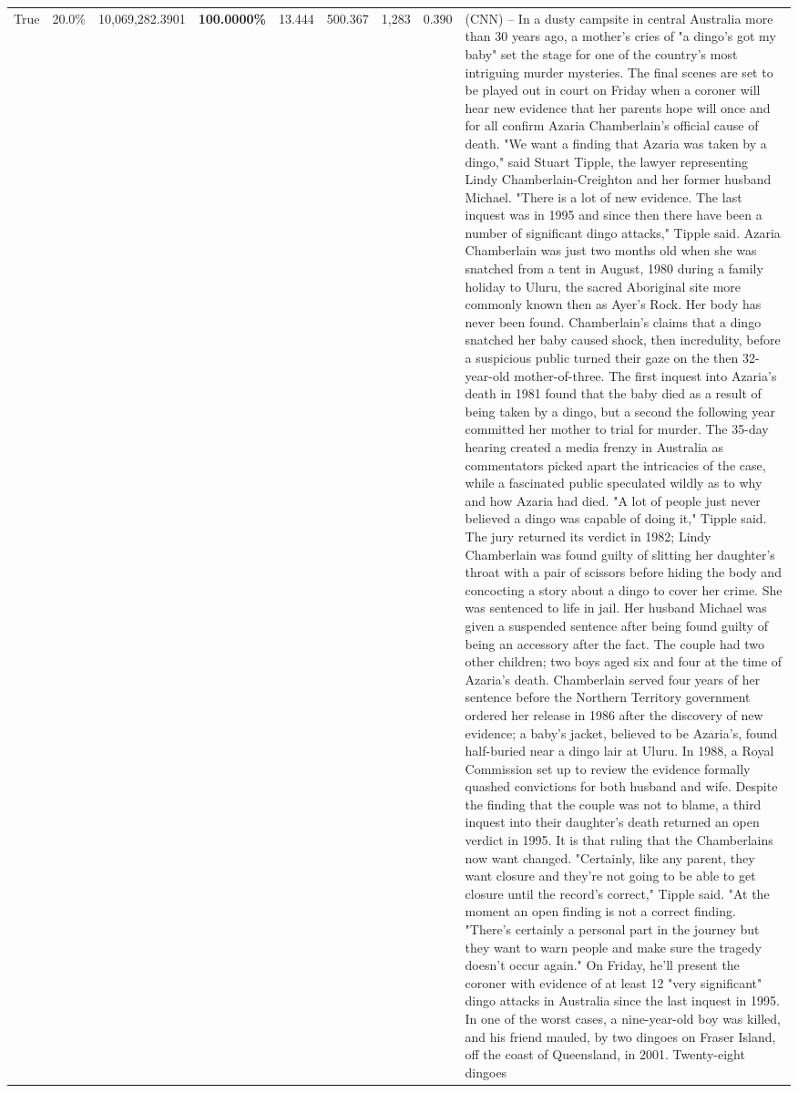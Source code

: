 \begin{table}[H]
\begin{tabular}{lllrlllll}
True & 20.0\% & 10,069,282.3901 & \bfseries \color{red} 100.0000\% & 13.444 & 500.367 & 1,283 & 0.390 & (CNN) -- In a dusty campsite in central Australia more than 30 years ago, a mother's cries of "a dingo's got my baby" set the stage for one of the country's most intriguing murder mysteries. The final scenes are set to be played out in court on Friday when a coroner will hear new evidence that her parents hope will once and for all confirm Azaria Chamberlain's official cause of death. "We want a finding that Azaria was taken by a dingo," said Stuart Tipple, the lawyer representing Lindy Chamberlain-Creighton and her former husband Michael. "There is a lot of new evidence. The last inquest was in 1995 and since then there have been a number of significant dingo attacks," Tipple said. Azaria Chamberlain was just two months old when she was snatched from a tent in August, 1980 during a family holiday to Uluru, the sacred Aboriginal site more commonly known then as Ayer's Rock. Her body has never been found. Chamberlain's claims that a dingo snatched her baby caused shock, then incredulity, before a suspicious public turned their gaze on the then 32-year-old mother-of-three. The first inquest into Azaria's death in 1981 found that the baby died as a result of being taken by a dingo, but a second the following year committed her mother to trial for murder. The 35-day hearing created a media frenzy in Australia as commentators picked apart the intricacies of the case, while a fascinated public speculated wildly as to why and how Azaria had died. "A lot of people just never believed a dingo was capable of doing it," Tipple said. The jury returned its verdict in 1982; Lindy Chamberlain was found guilty of slitting her daughter's throat with a pair of scissors before hiding the body and concocting a story about a dingo to cover her crime. She was sentenced to life in jail. Her husband Michael was given a suspended sentence after being found guilty of being an accessory after the fact. The couple had two other children; two boys aged six and four at the time of Azaria's death. Chamberlain served four years of her sentence before the Northern Territory government ordered her release in 1986 after the discovery of new evidence; a baby's jacket, believed to be Azaria's, found half-buried near a dingo lair at Uluru. In 1988, a Royal Commission set up to review the evidence formally quashed convictions for both husband and wife. Despite the finding that the couple was not to blame, a third inquest into their daughter's death returned an open verdict in 1995. It is that ruling that the Chamberlains now want changed. "Certainly, like any parent, they want closure and they're not going to be able to get closure until the record's correct," Tipple said. "At the moment an open finding is not a correct finding. "There's certainly a personal part in the journey but they want to warn people and make sure the tragedy doesn't occur again." On Friday, he'll present the coroner with evidence of at least 12 "very significant" dingo attacks in Australia since the last inquest in 1995. In one of the worst cases, a nine-year-old boy was killed, and his friend mauled, by two dingoes on Fraser Island, off the coast of Queensland, in 2001. Twenty-eight dingoes 
\end{tabular}
\end{table}

